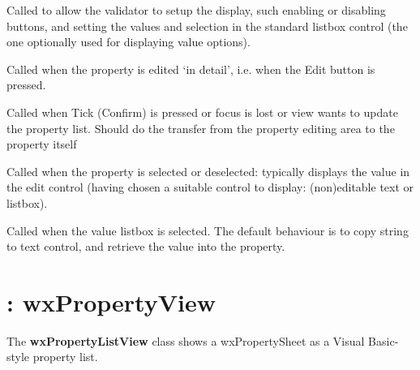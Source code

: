 Called to allow the validator to setup the display, such enabling or disabling buttons, and
setting the values and selection in the standard listbox control (the one optionally used for displaying
value options).


 
Called when the property is edited `in detail', i.e. when the Edit button is pressed.



Called when Tick (Confirm) is pressed or focus is lost or view wants to update
the property list. Should do the transfer from the property editing area to the property itself



Called when the property is selected or deselected: typically displays the value
in the edit control (having chosen a suitable control to display: (non)editable text or listbox).



Called when the value listbox is selected. The default behaviour is to copy
string to text control, and retrieve the value into the property.



\section{: wxPropertyView}\label{wxpropertylistview}


The {\bf wxPropertyListView} class shows a wxPropertySheet as a Visual Basic-style property list.

